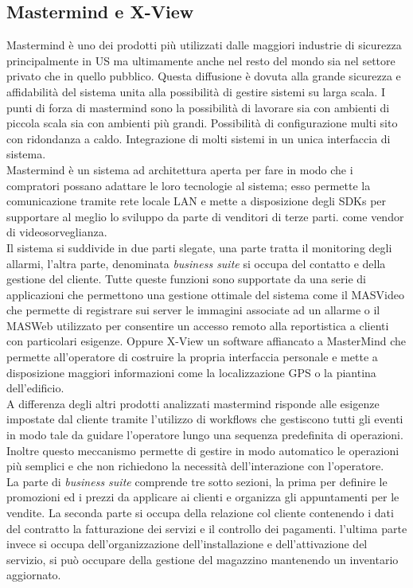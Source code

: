 \subsection{Mastermind e X-View}
Mastermind è uno dei prodotti più utilizzati dalle maggiori industrie di sicurezza principalmente in US ma ultimamente anche nel resto del mondo sia nel settore privato che in quello pubblico. Questa diffusione è dovuta alla grande sicurezza e affidabilità del sistema unita alla possibilità di gestire sistemi su larga scala. I punti di forza di mastermind sono la possibilità di lavorare sia con ambienti di piccola scala sia con ambienti più grandi. Possibilità di configurazione multi sito con ridondanza a caldo. Integrazione di molti sistemi in un unica interfaccia di sistema.\\
Mastermind è un sistema ad architettura aperta per fare in modo che i compratori possano adattare le loro tecnologie al sistema; esso permette la comunicazione tramite rete locale LAN e mette a disposizione degli SDKs per supportare al meglio lo sviluppo da parte di venditori di terze parti. come vendor di videosorveglianza.\\
Il sistema si suddivide in due parti slegate, una parte tratta il monitoring degli allarmi, l'altra parte, denominata \emph{business suite} si occupa del contatto e della gestione del cliente. Tutte queste funzioni sono supportate da una serie di applicazioni che permettono una gestione ottimale del sistema come il MASVideo che permette di registrare sui server le immagini associate ad un allarme o il MASWeb utilizzato per consentire un accesso remoto alla reportistica a clienti con particolari esigenze. Oppure X-View un software affiancato a MasterMind che permette all'operatore di costruire la propria interfaccia personale e mette a disposizione maggiori informazioni come la localizzazione GPS o la piantina dell'edificio.\\
A differenza degli altri prodotti analizzati mastermind risponde alle esigenze impostate dal cliente tramite l'utilizzo di workflows che gestiscono tutti gli eventi in modo tale da guidare l'operatore lungo una sequenza predefinita di operazioni. Inoltre questo meccanismo permette di gestire in modo automatico le operazioni più semplici e che non richiedono la necessità dell'interazione con l'operatore.\\
La parte di \emph{business suite} comprende tre sotto sezioni, la prima per definire le promozioni ed i prezzi da applicare ai clienti e organizza gli appuntamenti per le vendite. La seconda parte si occupa della relazione col cliente contenendo i dati del contratto la fatturazione dei servizi e il controllo dei pagamenti. l'ultima parte invece si occupa dell'organizzazione dell'installazione e dell'attivazione del servizio, si può occupare della gestione del magazzino mantenendo un inventario aggiornato.
